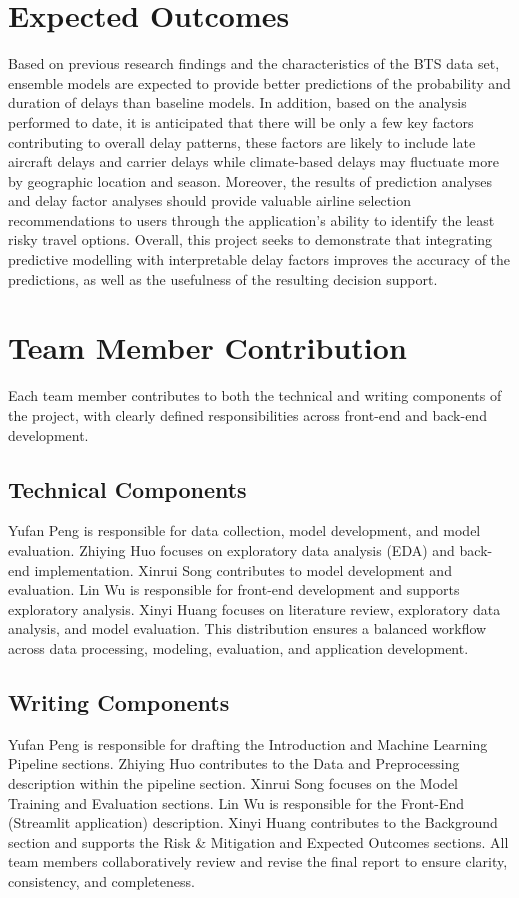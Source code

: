 \section{Expected Outcomes }

Based on previous research findings and the characteristics of the BTS data set, ensemble models are expected to provide better predictions of the probability and duration of delays than baseline models. In addition, based on the analysis performed to date, it is anticipated that there will be only a few key factors contributing to overall delay patterns, these factors are likely to include late aircraft delays and carrier delays while climate-based delays may fluctuate more by geographic location and season. Moreover, the results of prediction analyses and delay factor analyses should provide valuable airline selection recommendations to users through the application's ability to identify the least risky travel options. Overall, this project seeks to demonstrate that integrating predictive modelling with interpretable delay factors improves the accuracy of the predictions, as well as the usefulness of the resulting decision support.

\section{Team Member Contribution}

Each team member contributes to both the technical and writing components of the project, with clearly defined responsibilities across front-end and back-end development.

\subsection{Technical Components}

Yufan Peng is responsible for data collection, model development, and model evaluation. Zhiying Huo focuses on exploratory data analysis (EDA) and back-end implementation. Xinrui Song contributes to model development and evaluation. Lin Wu is responsible for front-end development and supports exploratory analysis. Xinyi Huang focuses on literature review, exploratory data analysis, and model evaluation. This distribution ensures a balanced workflow across data processing, modeling, evaluation, and application development.

\subsection{Writing Components}

Yufan Peng is responsible for drafting the Introduction and Machine Learning Pipeline sections. Zhiying Huo contributes to the Data and Preprocessing description within the pipeline section. Xinrui Song focuses on the Model Training and Evaluation sections. Lin Wu is responsible for the Front-End (Streamlit application) description. Xinyi Huang contributes to the Background section and supports the Risk \& Mitigation and Expected Outcomes sections. All team members collaboratively review and revise the final report to ensure clarity, consistency, and completeness.



